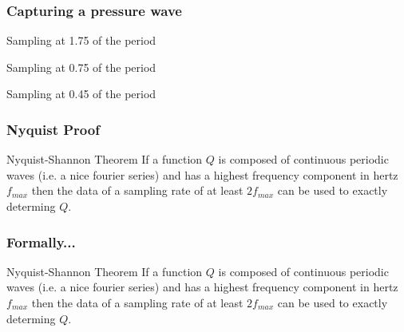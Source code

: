 \documentclass{beamer}
\begin{document}
\begin{frame}
\frametitle{Capturing a pressure wave}
\begin{block}{Sampling at 1.75 of the period}
\end{block}

\begin{block}{Sampling at 0.75 of the period}
\end{block}

\begin{block}{Sampling at 0.45 of the period}
\end{block}
\end{frame}

\begin{frame}
\frametitle{Nyquist Proof}

\begin{block}{Nyquist-Shannon Theorem}
If a function $Q$ is composed of continuous periodic waves (i.e. a nice fourier series) and has a highest frequency component in hertz  $f_{max}$ then the data of a sampling rate of at least $2f_{max}$ can be used to exactly determing $Q$.
\end{block}

\end{frame}

\begin{frame}
\frametitle{Formally...}

\begin{block}{Nyquist-Shannon Theorem}
If a function $Q$ is composed of continuous periodic waves (i.e. a nice fourier series) and has a highest frequency component in hertz  $f_{max}$ then the data of a sampling rate of at least $2f_{max}$ can be used to exactly determing $Q$.
\end{block}

\end{frame}
\end{document}
